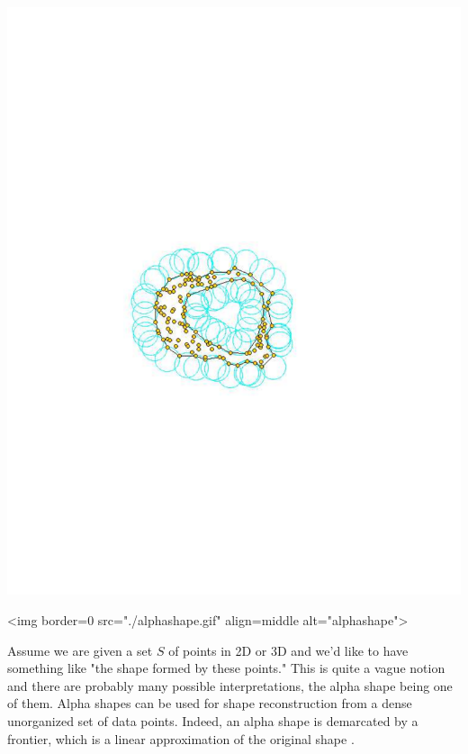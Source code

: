 \begin{ccTexOnly}
\begin{center}
\includegraphics{Alpha_shapes_3/alphashape} 
\end{center}
\end{ccTexOnly}
\begin{ccHtmlOnly}
<img border=0 src="./alphashape.gif"  align=middle  alt="alphashape">
\end{ccHtmlOnly}

Assume we are given a set $S$ of points in 2D or 3D and we'd like to
have something like "the shape formed by these points." This is
quite a vague notion and there are probably many possible
interpretations, the alpha shape  being one of them. Alpha shapes
can be used for shape reconstruction from a dense unorganized set of
data points. Indeed, an alpha shape  is demarcated by a frontier,
which is a linear approximation of the original shape \cite{bb-srmua-97t}.

